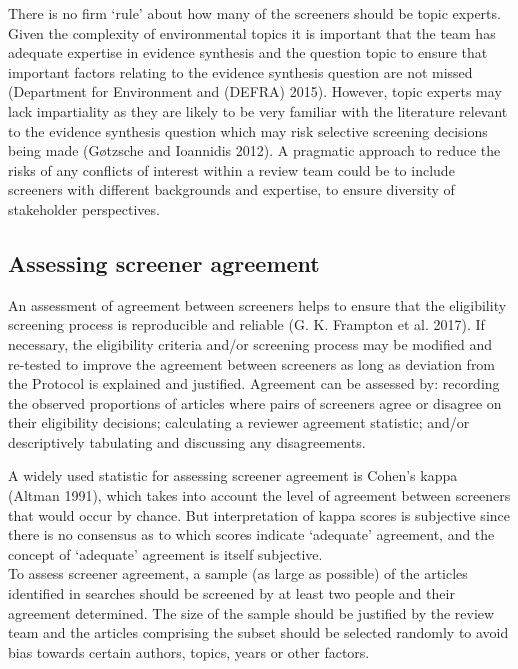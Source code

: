 \documentclass[
  letterpaper,
  DIV=11,
  numbers=noendperiod]{scrreprt}
\begin{document}
There is no firm `rule' about how many of the screeners should be topic
experts. Given the complexity of environmental topics it is important
that the team has adequate expertise in evidence synthesis and the
question topic to ensure that important factors relating to the evidence
synthesis question are not missed (Department for Environment and
(DEFRA) 2015). However, topic experts may lack impartiality as they are
likely to be very familiar with the literature relevant to the evidence
synthesis question which may risk selective screening decisions being
made (Gøtzsche and Ioannidis 2012). A pragmatic approach to reduce the
risks of any conflicts of interest within a review team could be to
include screeners with different backgrounds and expertise, to ensure
diversity of stakeholder perspectives.

\subsection{Assessing screener
agreement}\label{assessing-screener-agreement}

An assessment of agreement between screeners helps to ensure that the
eligibility screening process is reproducible and reliable (G. K.
Frampton et al. 2017). If necessary, the eligibility criteria and/or
screening process may be modified and re-tested to improve the agreement
between screeners as long as deviation from the Protocol is explained
and justified. Agreement can be assessed by: recording the observed
proportions of articles where pairs of screeners agree or disagree on
their eligibility decisions; calculating a reviewer agreement statistic;
and/or descriptively tabulating and discussing any disagreements.

A widely used statistic for assessing screener agreement is Cohen's
kappa (Altman 1991), which takes into account the level of agreement
between screeners that would occur by chance. But interpretation of
kappa scores is subjective since there is no consensus as to which
scores indicate `adequate' agreement, and the concept of `adequate'
agreement is itself subjective.\\
To assess screener agreement, a sample (as large as possible) of the
articles identified in searches should be screened by at least two
people and their agreement determined. The size of the sample should be
justified by the review team and the articles comprising the subset
should be selected randomly to avoid bias towards certain authors,
topics, years or other factors.
\end{document}
